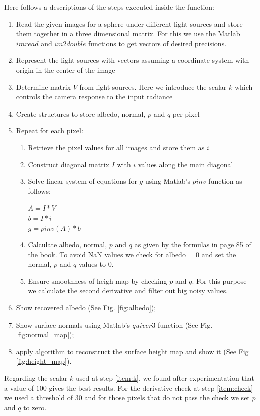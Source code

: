 \documentclass[11pt]{article}
\begin{document}
Here follows a descriptions of the steps executed inside the function:
\begin{enumerate}
	\item Read the given images for a sphere under different light sources and store them together in a three dimensional matrix. For this we use the Matlab $imread$ and $im2double$ functions to get vectors of desired precisions.
	\item Represent the light sources with vectors assuming a coordinate system with origin in the center of the image
	\item \label{item:k} Determine matrix $V$ from light sources. Here we introduce the scalar $k$ which controls the camera response to the input radiance
	\item Create structures to store albedo, normal, $p$ and $q$ per pixel
	\item Repeat for each pixel:
	\begin{enumerate}
		\item Retrieve the pixel values for all images and store them as $i$
		\item Construct diagonal matrix $I$ with $i$ values along the main diagonal
		\item Solve linear system of equations for $g$ using Matlab's $pinv$ function as follows:
		\begin{center}
		$A =  I * V$ \\
		$b =  I * i$ \\
		$g = pinv(A) * b$
		\end{center}
		\item Calculate albedo, normal, $p$ and $q$ as given by the formulas in page 85 of the book. To avoid NaN values we check for albedo = 0 and set the normal, $p$ and $q$ values to 0. 
		\item \label{item:check} Ensure smoothness of heigh map by checking $p$ and $q$. For this purpose we calculate the second derivative and filter out big noisy values.  
	\end{enumerate}
	\item Show recovered albedo (See Fig. \ref{fig:albedo});
	\item Show surface normals using Matlab's $quiver3$ function (See Fig. \ref{fig:normal_map});
	\item apply algorithm to reconstruct the surface height map and show it (See Fig \ref{fig:height_map}).
\end{enumerate}

Regarding the scalar $k$ used at step \ref{item:k}, we found after experimentation that a value of $100$ gives the best results.
For the derivative check at step \ref{item:check} we used a threshold of $30$ and for those pixels that do not pass the check we set $p$ and $q$ to zero.
\end{document}
